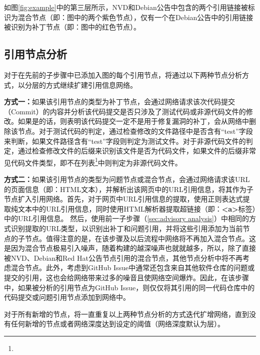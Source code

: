 
\begin{exmp}
如图\ref{fig:example}中的第三层所示，NVD和Debian公告中包含的两个引用链接被标识为混合节点（即：图中的两个紫色节点），仅有一个在Debian公告中的引用链接被识别为补丁节点（即：图中的红色节点）。
\end{exmp}

\subsection{引用节点分析}
对于在先前的子步骤中已添加入图的每个引用节点，\tool 将通过以下两种节点分析方式，以分层的方式继续扩建引用信息网络。%

\textbf{方式一：}如果该引用节点的类型为补丁节点，\tool 会通过网络请求该次代码提交（Commit）的内容并分析该代码提交是否只涉及了测试代码或非源代码文件的修改。如果是的话，则表明该代码提交一定不是用于修复漏洞的补丁，\tool 会从网络中删除该节点。对于测试代码的判定，\tool 通过检查修改的文件路径中是否含有“test”字段来判断，如果文件路径含有“test”字段则判定为测试文件。对于非源代码文件的判定，\tool 通过检查修改文件的后缀来识别该文件是否为代码文件，如果文件的后缀非常见代码文件类型，即不在列表\footnote{}中则判定为非源代码文件。

\textbf{方式二：}如果该引用节点的类型为问题节点或混合节点，\tool 会通过网络请求该URL的页面信息（即：HTML文本），并解析出该网页中的URL引用信息，将其作为子节点扩入引用网络。首先，对于网页中URL引用信息的提取，\tool 使用正则表达式提取纯文本中的URL引用信息，同时使用HTML解析器提取超链接（即：\textbf{<a>}标签）中的URL引用信息。
然后，使用前一子步骤（\ref{sec:advisory analysis}）中相同的方式识别提取的URL类型，以识别出补丁和问题引用，并将这些引用添加为当前节点的子节点。值得注意的是，在该步骤及以后流程中网络将不再加入混合节点。这是因为混合节点极易引入噪声，随着构建的越深噪声也就就越多，所以，除了直接被NVD、Debian和Red Hat公告节点引用的混合节点，其他节点分析中将不再考虑混合节点。此外，考虑到GitHub Issue中通常还包含来自其他软件仓库的问题或提交的引用，这也会给网络带来过多的噪音且使网络空间爆炸。因此，在该步骤中，如果被分析的引用节点为GitHub Issue，则仅仅将其引用的同一代码仓库中的代码提交或问题引用节点添加到网络中。

对于所有新增的节点，\tool 将一直重复以上两种节点分析的方式迭代扩增网络，直到没有任何新增的节点或者网络深度达到设定的阈值（网络深度默认为层）。


